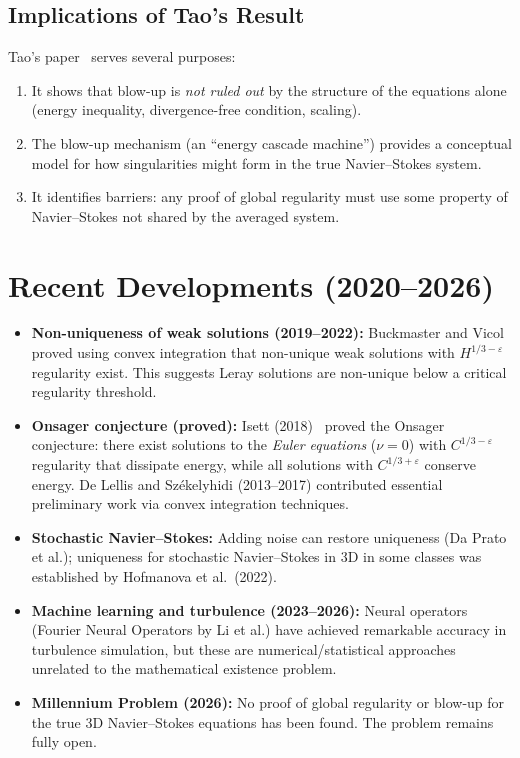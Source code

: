 \documentclass[12pt,a4paper]{article}
\theoremstyle{remark}
\begin{document}
\subsection{Implications of Tao's Result}

Tao's paper~\cite{Tao2016} serves several purposes:
\begin{enumerate}[nosep]
  \item It shows that blow-up is \emph{not ruled out} by the structure of the equations
    alone (energy inequality, divergence-free condition, scaling).
  \item The blow-up mechanism (an ``energy cascade machine'') provides a conceptual model
    for how singularities might form in the true Navier--Stokes system.
  \item It identifies barriers: any proof of global regularity must use some property
    of Navier--Stokes not shared by the averaged system.
\end{enumerate}

\section{Recent Developments (2020--2026)}

\begin{itemize}[nosep]
  \item \textbf{Non-uniqueness of weak solutions (2019--2022):} Buckmaster and
    Vicol~\cite{BuckmasterVicol2019} proved using convex integration that non-unique
    weak solutions with $H^{1/3-\varepsilon}$ regularity exist.  This suggests Leray
    solutions are non-unique below a critical regularity threshold.
  \item \textbf{Onsager conjecture (proved):} Isett (2018)~\cite{DeLellis2019}
    proved the Onsager conjecture: there exist solutions to the \emph{Euler equations}
    ($\nu=0$) with $C^{1/3-\varepsilon}$ regularity that dissipate energy, while all
    solutions with $C^{1/3+\varepsilon}$ conserve energy. De Lellis and Székelyhidi
    (2013--2017) contributed essential preliminary work via convex integration techniques.
  \item \textbf{Stochastic Navier--Stokes:} Adding noise can restore uniqueness (Da Prato
    et al.); uniqueness for stochastic Navier--Stokes in 3D in some classes was
    established by Hofmanova et al.\ (2022).
  \item \textbf{Machine learning and turbulence (2023--2026):} Neural operators (Fourier
    Neural Operators by Li et al.) have achieved remarkable accuracy in turbulence
    simulation, but these are numerical/statistical approaches unrelated to the mathematical
    existence problem.
  \item \textbf{Millennium Problem (2026):} No proof of global regularity or blow-up for
    the true 3D Navier--Stokes equations has been found.  The problem remains fully open.
\end{itemize}
\end{document}
